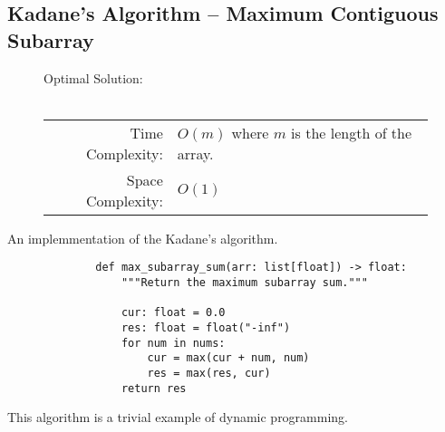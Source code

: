 
\subsection{Kadane's Algorithm -- Maximum Contiguous Subarray}

\begin{figure}[H]
    Optimal Solution:\\\\
    \begin{tabular}{rl}
        Time Complexity:& \(O(m)\) where \(m\) is the length of the array.\\
        Space Complexity:& \(O(1)\)
    \end{tabular}
\end{figure}

An implemmentation of the Kadane's algorithm.

\begin{figure}[H]
    \centering
    \begin{verbatim}
        def max_subarray_sum(arr: list[float]) -> float:
            """Return the maximum subarray sum."""

            cur: float = 0.0
            res: float = float("-inf")
            for num in nums:
                cur = max(cur + num, num)
                res = max(res, cur)
            return res
    \end{verbatim}
\end{figure}

This algorithm is a trivial example of dynamic programming.

